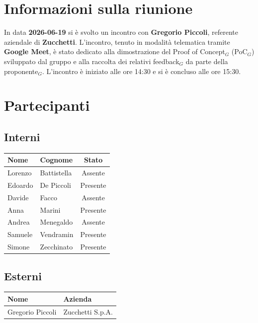 \documentclass[a4paper, 10pt, colorlinks=true, linkcolor=black, urlcolor=blue, citecolor=blue, hidelinks]{article}
\newcommand{\dataverbale}{2026-06-19}
\begin{document}
\begin{titlepage}

\end{titlepage}

\newpage

\pagestyle{fancy}

\tableofcontents

\newpage
{}

\section{Informazioni sulla riunione}
In data \textbf{\dataverbale} si è svolto un incontro con \textbf{Gregorio Piccoli}, referente aziendale di \textbf{Zucchetti}. L'incontro, tenuto in modalità telematica tramite \textbf{Google Meet}, è stato dedicato alla dimostrazione del Proof of Concept$_G$ (PoC$_G$) sviluppato dal gruppo e alla raccolta dei relativi feedback$_G$ da parte della proponente$_G$. L'incontro è iniziato alle ore 14:30 e si è concluso alle ore 15:30.

\section{Partecipanti}

\subsection{Interni}
\begin{center}
\begin{tabular}{|l|l|c|}
\hline
\textbf{Nome} & \textbf{Cognome} & \textbf{Stato} \\
\hline
Lorenzo & Battistella & Assente \\
Edoardo & De Piccoli & Presente \\
Davide & Facco & Assente \\
Anna & Marini & Presente \\
Andrea & Menegaldo & Assente \\
Samuele & Vendramin & Presente \\
Simone & Zecchinato & Presente \\
\hline
\end{tabular}
\end{center}

\subsection{Esterni}
\begin{center}
\begin{tabular}{|l|l|}
\hline
\textbf{Nome} & \textbf{Azienda} \\
\hline
Gregorio Piccoli & Zucchetti S.p.A. \\
\hline
\end{tabular}
\end{center}
\end{document}
